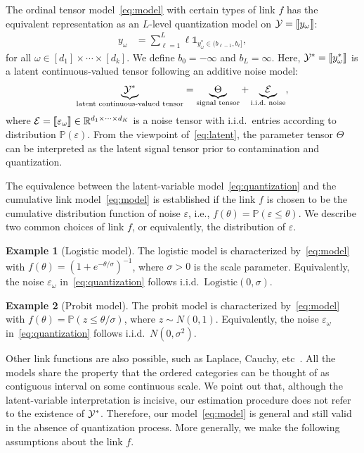 \documentclass{article}
\theoremstyle{plain}
\theoremstyle{definition}
\newtheorem{example}{Example}
\newcommand*{\KeepStyleUnderBrace}[1]{%
  \mathop{%
    \mathchoice
    {\underbrace{\displaystyle#1}}%
    {\underbrace{\textstyle#1}}%
    {\underbrace{\scriptstyle#1}}%
    {\underbrace{\scriptscriptstyle#1}}%
  }\limits
}
\begin{document}
The ordinal tensor model~\eqref{eq:model} with certain types of link $f$ has the equivalent representation as an $L$-level quantization model on $\mathcal{Y}=\llbracket y_\omega \rrbracket$:
\begin{align}\label{eq:quantization}
y_\omega&=\sum_{\ell = 1}^L \ell\mathds{1}_{y^*_\omega \in (b_{\ell-1},b_\ell]},
\end{align}
for all $\omega\in[d_1]\times \cdots \times [d_k]$. We define $b_0 = -\infty$ and $b_L = \infty$. Here, $\mathcal{Y}^*=\llbracket y^*_\omega \rrbracket$ is a latent continuous-valued tensor following an additive noise model:
\begin{align}\label{eq:latent}
\KeepStyleUnderBrace{\tY^*}_{\text{latent continuous-valued tensor}}=\KeepStyleUnderBrace{\Theta}_{\text{signal tensor}}+\KeepStyleUnderBrace{\tE}_{\text{i.i.d.\ noise}},
\end{align}
where $\mathcal{E}=\llbracket \varepsilon_\omega \rrbracket\in\mathbb{R}^{d_1\times \cdots \times d_K}$ is a noise tensor with i.i.d.\ entries according to distribution $\mathbb{P}(\varepsilon)$. From the viewpoint of~\eqref{eq:latent}, the parameter tensor $\Theta$ can be interpreted as the latent signal tensor prior to contamination and quantization.

The equivalence between the latent-variable model~\eqref{eq:quantization} and the cumulative link model~\eqref{eq:model} is established if the link $f$ is chosen to be the cumulative distribution function of noise $\varepsilon$, i.e., $f(\theta)=\mathbb{P}(\varepsilon\leq \theta)$. We describe two common choices of link $f$, or equivalently, the distribution of $\varepsilon$.

\begin{example}[Logistic model] The logistic model is characterized by~\eqref{eq:model} with $f(\theta)=(1+e^{-\theta/\sigma})^{-1}$, where $\sigma>0$ is the scale parameter. Equivalently, the noise $\varepsilon_\omega$ in~\eqref{eq:quantization} follows i.i.d.\ $\text{Logistic}(0,\sigma)$.
\end{example}
\begin{example}[Probit model] The probit model is characterized by~\eqref{eq:model} with
$f(\theta)=\mathbb{P}(z\leq \theta/\sigma)$, where $z\sim N(0,1)$. Equivalently, the noise $\varepsilon_\omega$ in~\eqref{eq:quantization} follows i.i.d.\ $N(0,\sigma^2)$.
\end{example}
\vspace{-.2cm}
Other link functions are also possible, such as Laplace, Cauchy, etc~\cite{mccullagh1980regression}. All the models share the property that the ordered categories can be thought of as contiguous interval on some continuous scale. We point out that, although the latent-variable interpretation is incisive, our estimation procedure does not refer to the existence of $\mathcal{Y}^*$. Therefore, our model~\eqref{eq:model} is general and still valid in the absence of quantization process. More generally, we make the following assumptions about the link $f$.
\end{document}
